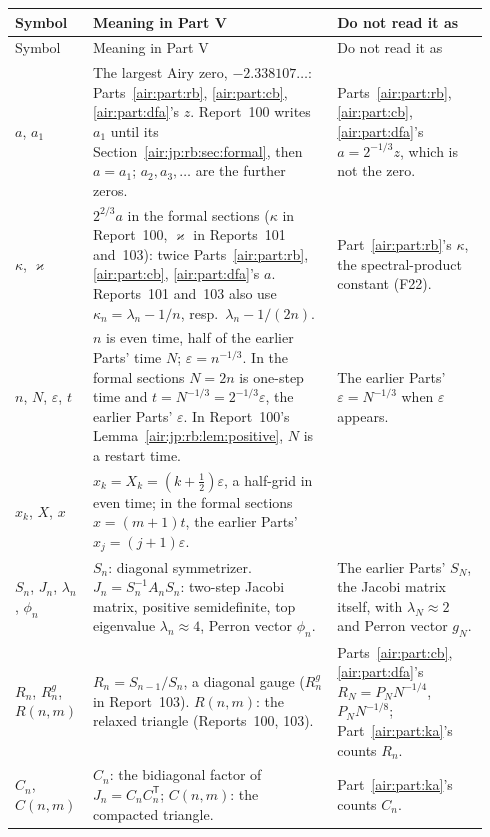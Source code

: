 \documentclass[11pt,letterpaper]{article}
\numberwithin{equation}{section}
\theoremstyle{remark}
\newcommand{\eps}{\varepsilon}
\begin{document}
{\small
\begin{longtable}{@{}>{\raggedright\arraybackslash}p{0.13\linewidth}>{\raggedright\arraybackslash}p{0.5\linewidth}>{\raggedright\arraybackslash}p{0.31\linewidth}@{}}
\toprule
Symbol & Meaning in Part V & Do not read it as\\
\midrule
\endfirsthead
\toprule
Symbol & Meaning in Part V & Do not read it as\\
\midrule
\endhead
\bottomrule
\endfoot
$a$, $a_1$ & The largest Airy zero, $-2.338107\ldots$: Parts~\ref{air:part:rb}, \ref{air:part:cb}, \ref{air:part:dfa}'s $z$. Report~100 writes $a_1$ until its Section~\ref{air:jp:rb:sec:formal}, then $a=a_1$; $a_2,a_3,\ldots$ are the further zeros. & Parts~\ref{air:part:rb}, \ref{air:part:cb}, \ref{air:part:dfa}'s $a=2^{-1/3}z$, which is not the zero.\\
$\kappa$, $\varkappa$ & $2^{2/3}a$ in the formal sections ($\kappa$ in Report~100, $\varkappa$ in Reports~101 and~103): twice Parts~\ref{air:part:rb}, \ref{air:part:cb}, \ref{air:part:dfa}'s $a$. Reports~101 and~103 also use $\kappa_n=\lambda_n-1/n$, resp.\ $\lambda_n-1/(2n)$. & Part~\ref{air:part:rb}'s $\kappa$, the spectral-product constant (F22).\\
$n$, $N$, $\eps$, $t$ & $n$ is even time, half of the earlier Parts' time $N$; $\eps=n^{-1/3}$. In the formal sections $N=2n$ is one-step time and $t=N^{-1/3}=2^{-1/3}\eps$, the earlier Parts' $\eps$. In Report~100's Lemma~\ref{air:jp:rb:lem:positive}, $N$ is a restart time. & The earlier Parts' $\eps=N^{-1/3}$ when $\eps$ appears.\\
$x_k$, $X$, $x$ & $x_k=X_k=(k+\frac12)\eps$, a half-grid in even time; in the formal sections $x=(m+1)t$, the earlier Parts' $x_j=(j+1)\eps$. & \\
$S_n$, $J_n$, $\lambda_n$, $\phi_n$ & $S_n$: diagonal symmetrizer. $J_n=S_n^{-1}A_nS_n$: two-step Jacobi matrix, positive semidefinite, top eigenvalue $\lambda_n\approx4$, Perron vector $\phi_n$. & The earlier Parts' $S_N$, the Jacobi matrix itself, with $\lambda_N\approx2$ and Perron vector $g_N$.\\
$R_n$, $R_n^g$, $R(n,m)$ & $R_n=S_{n-1}/S_n$, a diagonal gauge ($R_n^g$ in Report~103). $R(n,m)$: the relaxed triangle (Reports~100, 103). & Parts~\ref{air:part:cb}, \ref{air:part:dfa}'s $R_N=P_NN^{-1/4}$, $P_NN^{-1/8}$; Part~\ref{air:part:ka}'s counts $R_n$.\\
$C_n$, $C(n,m)$ & $C_n$: the bidiagonal factor of $J_n=C_nC_n^{\mathsf T}$; $C(n,m)$: the compacted triangle. & Part~\ref{air:part:ka}'s counts $C_n$.\\

\end{longtable}}
\end{document}
